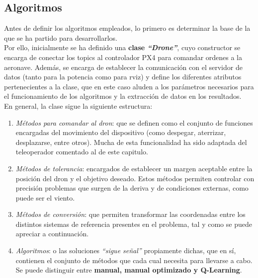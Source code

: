 \subsection{Algoritmos}
\label{subsec:algoritmo_sf}

Antes de definir los algoritmos empleados, lo primero es determinar la base de la que se ha partido para desarrollarlos.\\

Por ello, inicialmente se ha definido una \textbf{clase \emph{``Drone''}}, cuyo constructor se encarga de conectar los topics al controlador PX4 para comandar ordenes a la aeronave. Además, se encarga de establecer la comunicación con el servidor de datos (tanto para la potencia como para rviz) y define los diferentes atributos pertenecientes a la clase, que en este caso aluden a los parámetros necesarios para el funcionamiento de los algoritmos y la extracción de datos en los resultados.\\

En general, la clase sigue la siguiente estructura:

\begin{enumerate}
	\item \emph{Métodos para comandar al dron}: que se definen como el conjunto de funciones encargadas del movimiento del dispositivo (como despegar, aterrizar, desplazarse, entre otros). Mucha de esta funcionalidad ha sido adaptada del teleoperador comentado al de este capitulo.

    \item \emph{Métodos de tolerancia}: encargados de establecer un margen aceptable entre la posición del dron y el objetivo deseado. Estos métodos permiten controlar con precisión problemas que surgen de la deriva y de condiciones externas, como puede ser el viento.

	\item \emph{Métodos de conversión}: que permiten transformar las coordenadas entre los distintos sistemas de referencia presentes en el problema, tal y como se puede apreciar a continuación.

    \item \emph{Algoritmos}: o las soluciones \emph{``sigue señal''} propiamente dichas, que en sí, contienen el conjunto de métodos que cada cual necesita para llevarse a cabo. Se puede distinguir entre \textbf{manual, manual optimizado y Q-Learning}.
\end{enumerate}

